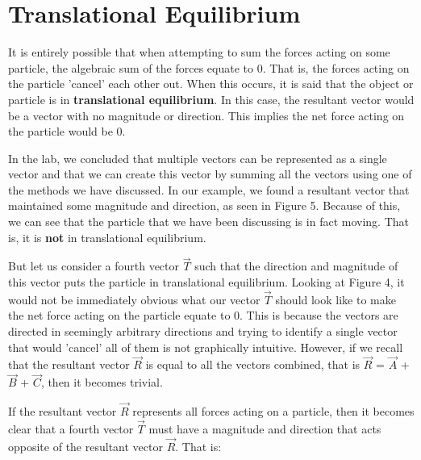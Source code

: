 \documentclass[12pt]{article}
\begin{document}
\section{Translational Equilibrium}
It is entirely possible that when attempting to sum the forces acting on some particle, the algebraic sum of the forces equate to 0. That is, the forces acting on the particle 'cancel' each other out. When this occurs, it is said that the object or particle is in \textbf{translational equilibrium}. In this case, the resultant vector would be a vector with no magnitude or direction. This implies the net force acting on the particle would be 0.

In the lab, we concluded that multiple vectors can be represented as a single vector and that we can create this vector by summing all the vectors using one of the methods we have discussed. In our example, we found a resultant vector that maintained some magnitude and direction, as seen in Figure 5. Because of this, we can see that the particle that we have been discussing is in fact moving. That is, it is \textbf{not} in translational equilibrium.

But let us consider a fourth vector $\vec{T}$ such that the direction and magnitude of this vector puts the particle in translational equilibrium. Looking at Figure 4, it would not be immediately obvious what our vector $\vec{T}$ should look like to make the net force acting on the particle equate to 0. This is because the vectors are directed in seemingly arbitrary directions and trying to identify a single vector that would 'cancel' all of them is not graphically intuitive. However, if we recall that the resultant vector $\vec{R}$ is equal to all the vectors combined, that is $\vec{R}$ = $\vec{A}$ + $\vec{B}$ + $\vec{C}$, then it becomes trivial.

If the resultant vector $\vec{R}$ represents all forces acting on a particle, then it becomes clear that a fourth vector $\vec{T}$ must have a magnitude and direction that acts opposite of the resultant vector $\vec{R}$. That is:
\end{document}
